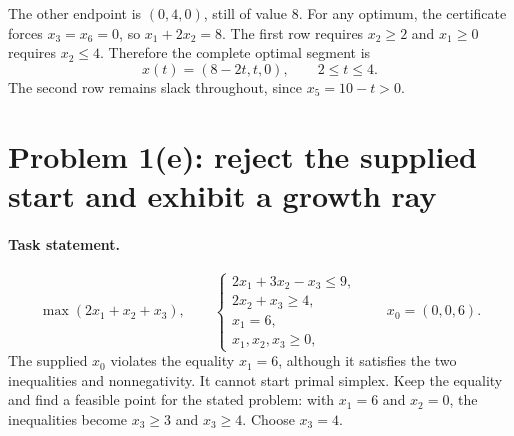 \documentclass[11pt,a4paper]{article}
\begin{document}
The other endpoint is $(0,4,0)$, still of value 8. For any optimum,
the certificate forces $x_3=x_6=0$, so $x_1+2x_2=8$.
The first row requires $x_2\geq2$ and $x_1\geq0$ requires $x_2\leq4$.
Therefore the complete optimal segment is
\begin{equation}\label{eq:d-segment}
  x(t)=(8-2t,t,0),\qquad2\leq t\leq4.
\end{equation}
The second row remains slack throughout, since $x_5=10-t>0$.

\section{Problem 1(e): reject the supplied start and exhibit a growth ray}\label{sec:e}
\paragraph{Task statement.}
\[
  \max(2x_1+x_2+x_3),\qquad
  \begin{cases}
    2x_1+3x_2-x_3\leq9, \\
    2x_2+x_3\geq4,      \\
    x_1=6,              \\
    x_1,x_2,x_3\geq0,
  \end{cases}
  \qquad x_0=(0,0,6).
\]
The supplied $x_0$ violates the equality $x_1=6$, although it satisfies the
two inequalities and nonnegativity. It cannot start primal simplex. Keep the
equality and find a feasible point for the stated problem: with $x_1=6$
and $x_2=0$, the inequalities become $x_3\geq3$ and $x_3\geq4$.
Choose $x_3=4$.
\end{document}
